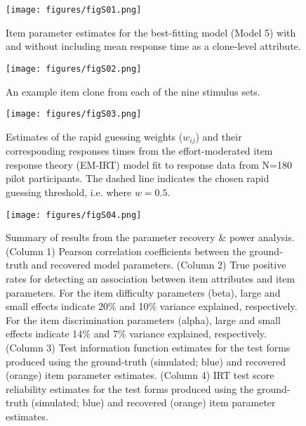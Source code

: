 \documentclass[a4paper,man,natbib]{apa6}
\begin{document}
\begin{figure}
\centering
\texttt{[image: figures/figS01.png]}
\caption{\label{fig:figS01} Item parameter estimates for the best-fitting model (Model 5) with and without including mean response time as a clone-level attribute.}
\end{figure}

\begin{figure}
\centering
\texttt{[image: figures/figS02.png]}
\caption{\label{fig:figS02} An example item clone from each of the nine stimulus sets.}
\end{figure}

\begin{figure}
\centering
\texttt{[image: figures/figS03.png]}
\caption{\label{fig:figS03} Estimates of the rapid guessing weights ($w_{ij}$) and their corresponding responses times from the effort-moderated item response theory (EM-IRT) model fit to response data from N=180 pilot participants. The dashed line indicates the chosen rapid guessing threshold, i.e. where $w = 0.5$.}
\end{figure}

\begin{figure}
\centering
\texttt{[image: figures/figS04.png]}
\caption{\label{fig:figS04} Summary of results from the parameter recovery \& power analysis. (Column 1) Pearson correlation coefficients between the ground-truth and recovered model parameters. (Column 2) True positive rates for detecting an association between item attributes and item parameters. For the item difficulty parameters (beta), large and small effects indicate 20\% and 10\% variance explained, respectively. For the item discrimination parameters (alpha), large and small effects indicate 14\% and 7\% variance explained, respectively. (Column 3) Test information function estimates for the test forms produced using the ground-truth (simulated; blue) and recovered (orange) item parameter estimates. (Column 4) IRT test score reliability estimates for the test forms produced using the ground-truth (simulated; blue) and recovered (orange) item parameter estimates.}
\end{figure}
\end{document}
